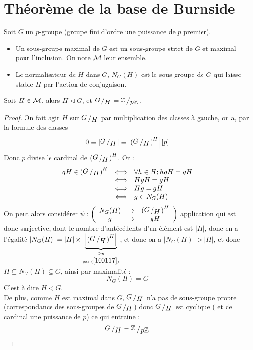 
\section{Théorème de la base de Burnside}
	 

Soit $G$ un $p$-groupe (groupe fini d'ordre une puissance de $p$ premier).



\begin{de}
	\begin{itemize}
		\item Un sous-groupe maximal de $G$ est un sous-groupe strict de $G$ et maximal pour l'inclusion. On note $\mathcal{M}$ leur ensemble. 
		\item Le normalisateur de $H$ dans $G$, $N_G(H)$ est le sous-groupe de $G$ qui laisse stable $H$ par l'action de conjugaison.
	\end{itemize}
\end{de}


\begin{lem}
	Soit $H \in \mathcal{M}$, alors $H \triangleleft G$, et $\bigslant{G}{H} = \bigslant{\ZZ}{p\ZZ}$.
\end{lem}
\begin{proof}
	On fait agir $H$ sur $\bigslant{G}{H}$ par multiplication des classes à gauche, on a, par la formule des classes 
	\begin{equation}\label{100117}
		0 \equiv \vert \bigslant{G}{H} \vert \equiv  \left\vert \left( \bigslant{G}{H} \right)^H \right\vert [p]
	\end{equation}
	\noindent Donc  $p$ divise le cardinal de $\left( \bigslant{G}{H} \right)^H $. Or :
	\[
		\begin{array}{lll}
			gH \in \left( \bigslant{G}{H} \right)^H  &\Longleftrightarrow& \forall h \in H;  hg H = gH\\
			 & \Longleftrightarrow&  Hg H = gH \\
			 &\Longleftrightarrow&  Hg = gH\\
			  &\Longleftrightarrow& g \in N_G(H)
		\end{array}
	\]
	On peut alors considérer $\psi : \left( \begin{array}{cccc} N_G(H) & \to &\left( \bigslant{G}{H} \right)^H \\ g & \mapsto &gH \end{array} \right)$ application qui est donc surjective, dont le nombre d'antécédents d'un élément est $\vert H \vert$, donc on a l'égalité $\vert N_G(H) \vert = \vert H \vert \times  \underbrace{\left\vert \left(\bigslant{G}{H} \right)^H  \right\vert}_{\underset{ \mbox{\tiny{par} } (\ref{100117}) }{ \geq p}}$, et donc on a  $\vert N_G(H) \vert > \vert H \vert$, et donc $H \subsetneq N_G(H) \subseteq G$, ainsi par maximalité :
	\[ 
		N_G(H) = G  
	\]
	C'est à dire $H \triangleleft G$.
	\\
	De plus, comme $H$ est maximal dans $G$, $\bigslant{G}{H}$ n'a pas de sous-groupe propre (correspondance des sous-groupes de $\bigslant{G}{H}$) donc $\bigslant{G}{H}$ est cyclique ( et de cardinal une puissance de $p$) ce qui entraine :  
	\[ 
		\bigslant{G}{H} = \bigslant{\ZZ}{p\ZZ} 
	\]
\end{proof}


